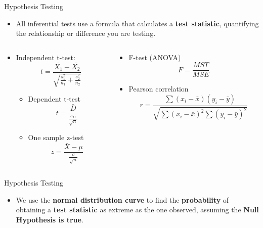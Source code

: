\documentclass[
  ignorenonframetext,
]{beamer}
\providecommand{\tightlist}{%
  \setlength{\itemsep}{0pt}\setlength{\parskip}{0pt}}
\begin{document}
\begin{frame}{Hypothesis Testing}
\label{hypothesis-testing}
\begin{itemize}
\tightlist
\item
  All inferential tests use a formula that calculates a \textbf{test
  statistic}, quantifying the relationship or difference you are
  testing.
\end{itemize}

\begin{columns}[T]
\begin{column}{0.48\textwidth}
\small

\begin{itemize}
\item
  Independent t-test:
  \[t = \frac{\bar{X_1} - \bar{X_2}}{\sqrt{\frac{s_1^2}{n_1} + \frac{s_2^2}{n_2}}}\]

  \begin{itemize}
  \item
    Dependent t-test \[t = \frac{\bar{D}}{\frac{s_D}{\sqrt{n}}}\]
  \item
    One sample z-test
    \[z = \frac{\bar{X} - \mu}{\frac{\sigma}{\sqrt{n}}}\] \small  
  \end{itemize}
\end{itemize}
\end{column}

\begin{column}{0.48\textwidth}
\small

\begin{itemize}
\item
  F-test (ANOVA) \[F = \frac{MST}{MSE}\]
\item
  Pearson correlation
  \[r = \frac{\sum (x_i - \bar{x})(y_i - \bar{y})}{\sqrt{\sum (x_i - \bar{x})^2 \sum (y_i - \bar{y})^2}}\]\\
\end{itemize}
\end{column}
\end{columns}
\end{frame}

\begin{frame}{Hypothesis Testing}
\label{hypothesis-testing-1}
\begin{itemize}
\tightlist
\item
  We use the \textbf{normal distribution curve} to find the
  \textbf{probability} of obtaining a \textbf{test statistic} as extreme
  as the one observed, assuming the \textbf{Null Hypothesis is true}.
\end{itemize}
\end{frame}
\end{document}
